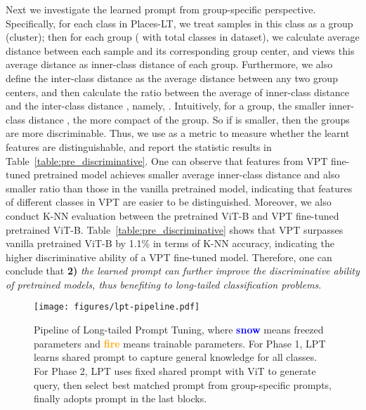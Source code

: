 \documentclass{article} \usepackage{iclr2023_conference,times}
\begin{document}
Next we investigate the learned prompt from group-specific perspective.   
Specifically, for each class in Places-LT, we treat samples  in this class as a group (cluster); then for each group  ( with total  classes in dataset), we calculate average  distance between each sample and its corresponding group center, and views this average  distance as inner-class distance  of each group. 
Furthermore, we also define the inter-class distance  as the average distance between any two group centers, and then calculate the ratio  between the average of inner-class distance   and the inter-class distance , namely,  .  
Intuitively,  for a group, the smaller   inner-class distance , the more compact of the group. So if  is smaller, then the groups are more discriminable.   Thus, we use  as a metric to measure whether the learnt features are distinguishable, and report the  statistic results  in Table~\ref{table:pre_discriminative}.  One can observe that features from VPT fine-tuned pretrained model achieves smaller  average  inner-class distance  and also smaller ratio  than those in the vanilla pretrained model,   indicating  that features of different classes in VPT  are easier to be distinguished. 
Moreover, we also conduct K-NN evaluation between the pretrained  ViT-B and VPT fine-tuned pretrained ViT-B. Table~\ref{table:pre_discriminative} shows that VPT surpasses vanilla pretrained ViT-B by 1.1\% in terms of K-NN accuracy, indicating the higher  discriminative ability of a  VPT  fine-tuned  model.  Therefore, one can conclude that \textbf{2)} \textit{the learned prompt can further improve the discriminative ability of pretrained models, thus benefiting to long-tailed classification problems}. 

\begin{figure}
\begin{center}
\texttt{[image: figures/lpt-pipeline.pdf]}
\end{center}
\vspace{-0.5em}
\caption{Pipeline of Long-tailed Prompt Tuning, where \textbf{\textcolor{blue}{snow}} means freezed parameters and \textbf{\textcolor{orange}{fire}} means trainable parameters. 
For Phase 1, LPT learns shared prompt to capture general knowledge for all classes. For Phase 2, LPT uses fixed shared prompt with ViT to generate query, then select best matched prompt from group-specific prompts, finally adopts prompt in the last  blocks. 
}
\vspace{-1em}
\label{fig:pipeline}
\end{figure}
\end{document}
